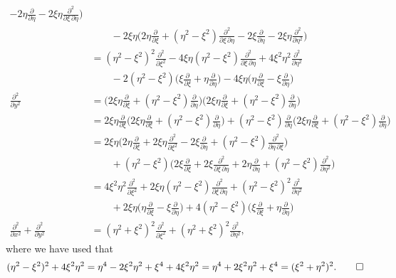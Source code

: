 \begin{loesung}
\begin{teilaufgaben}
\begin{align*}
-2\eta\frac{\partial}{\partial\eta}
-2\xi\eta\frac{\partial^2}{\partial\xi\,\partial\eta}
\biggr)
\\
&\qquad
-2\xi\eta\biggl(
2\eta\frac{\partial}{\partial\xi}
+
(\eta^2-\xi^2)\frac{\partial^2}{\partial\xi\,\partial\eta}
-2\xi\frac{\partial}{\partial\eta}
-2\xi\eta\frac{\partial^2}{\partial\eta^2}
\biggr)
\\
&=
(\eta^2-\xi^2)^2\frac{\partial^2}{\partial\xi^2}
-
4\xi\eta(\eta^2-\xi^2)
\frac{\partial^2}{\partial\xi\,\partial\eta}
+4\xi^2\eta^2
\frac{\partial^2}{\partial\eta^2}
\\
&\qquad
-
2(\eta^2-\xi^2)\bigg(
\xi\frac{\partial}{\partial\xi}+\eta\frac{\partial}{\partial\eta}
\biggr)
-4\xi\eta\biggl(
\eta\frac{\partial}{\partial\xi}-\xi\frac{\partial}{\partial\eta}
\biggr)
\\
\frac{\partial^2}{\partial y^2}
&=
\biggl(
2\xi\eta
\frac{\partial}{\partial\xi}
+
(\eta^2-\xi^2)
\frac{\partial}{\partial\eta}
\biggr)
\biggl(
2\xi\eta
\frac{\partial}{\partial\xi}
+
(\eta^2-\xi^2)
\frac{\partial}{\partial\eta}
\biggr)
\\
&=
2\xi\eta
\frac{\partial}{\partial\xi}
\biggl(
2\xi\eta
\frac{\partial}{\partial\xi}
+
(\eta^2-\xi^2)
\frac{\partial}{\partial\eta}
\biggr)
+(\eta^2-\xi^2)\frac{\partial}{\partial\eta}
\biggl(
2\xi\eta
\frac{\partial}{\partial\xi}
+
(\eta^2-\xi^2)
\frac{\partial}{\partial\eta}
\biggr)
\\
&=
2\xi\eta
\biggl(
2\eta\frac{\partial}{\partial\xi}
+2\xi\eta\frac{\partial^2}{\partial\xi^2}
-2\xi\frac{\partial}{\partial\eta}
+(\eta^2-\xi^2)\frac{\partial^2}{\partial\eta\,\partial\xi}
\biggr)
\\
&\qquad
+(\eta^2-\xi^2)
\biggl(
2\xi\frac{\partial}{\partial\xi}
+
2\xi\frac{\partial^2}{\partial\xi\,\partial\eta}
+
2\eta\frac{\partial}{\partial\eta}
+
(\eta^2-\xi^2)\frac{\partial^2}{\partial\eta^2}
\biggr)
\\
&=
4\xi^2\eta^2\frac{\partial^2}{\partial\xi^2}
+
2\xi\eta(\eta^2-\xi^2)
\frac{\partial^2}{\partial\xi\,\partial\eta}
+(\eta^2-\xi^2)^2\frac{\partial^2}{\partial\eta^2}
\\
&\qquad
+2\xi\eta\biggl(
\eta\frac{\partial}{\partial\xi}-\xi\frac{\partial}{\partial\eta}
\biggl)
+
4(\eta^2-\xi^2)\biggl(
\xi\frac{\partial}{\partial\xi}
+
\eta\frac{\partial}{\partial\eta}
\biggr)
\\
\frac{\partial^2}{\partial x^2}
+
\frac{\partial^2}{\partial y^2}
&=
(\eta^2+\xi^2)^2\frac{\partial^2}{\partial\xi^2}
+
(\eta^2+\xi^2)^2\frac{\partial^2}{\partial\eta^2},
\end{align*}
where we have used that
\[
(\eta^2-\xi^2)^2+4\xi^2\eta^2
=
\eta^4-2\xi^2\eta^2 +\xi^4 + 4\xi^2\eta^2
=
\eta^4+2\xi^2\eta^2 +\xi^4
=
(\xi^2+\eta^2)^2.
\qedhere
\]
\end{teilaufgaben}
\end{loesung}
